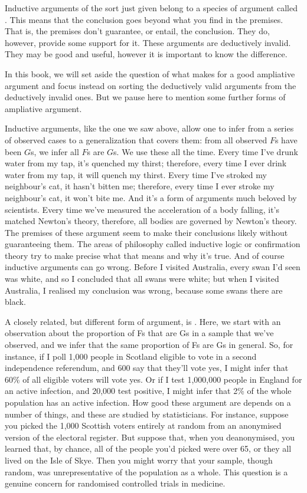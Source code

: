Inductive arguments of the sort just given belong to a species of argument called . This means that the conclusion goes beyond what you find in the premises. That is, the premises don't guarantee, or entail, the conclusion. They do, however, provide some support for it. These arguments are deductively invalid. They may be good and useful, however it is important to know the difference.

In this book, we will set aside the question of what makes for a good ampliative argument and focus instead on sorting the deductively valid arguments from the deductively invalid ones.
But we pause here to mention some further forms of ampliative argument.

Inductive arguments, like the one we saw above, allow one to infer from a series of observed cases to a generalization that covers them: from all observed $F$s have been $G$s, we infer all $F$s are $G$s. We use these all the time. Every time I've drunk water from my tap, it's quenched my thirst; therefore, every time I ever drink water from my tap, it will quench my thirst. Every time I've stroked my neighbour's cat, it hasn't bitten me; therefore, every time I ever stroke my neighbour's cat, it won't bite me. And it's a form of arguments much beloved by scientists. Every time we've measured the acceleration of a body falling, it's matched Newton's theory, therefore, all bodies are governed by Newton's theory. The premises of these argument seem to make their conclusions likely without guaranteeing them. The areas of philosophy called inductive logic or confirmation theory try to make precise what that means and why it's true. And of course inductive arguments can go wrong. Before I visited Australia, every swan I'd seen was white, and so I concluded that all swans were white; but when I visited Australia, I realised my conclusion was wrong, because some swans there are black.

A closely related, but different form of argument, is . Here, we start with an observation about the proportion of Fs that are Gs in a sample that we've observed, and we infer that the same proportion of Fs are Gs in general. So, for instance, if I poll 1,000 people in Scotland eligible to vote in a second independence referendum, and 600 say that they'll vote yes, I might infer that 60\% of all eligible voters will vote yes. Or if I test 1,000,000 people in England for an active infection, and 20,000 test positive, I might infer that 2\% of the whole population has an active infection. How good these argument are depends on a number of things, and these are studied by statisticians. For instance, suppose you picked the 1,000 Scottish voters entirely at random from an anonymised version of the electoral register. But suppose that, when you deanonymised, you learned that, by chance, all of the people you'd picked were over 65, or they all lived on the Isle of Skye. Then you might worry that your sample, though random, was unrepresentative of the population as a whole. This question is a genuine concern for randomised controlled trials in medicine.

